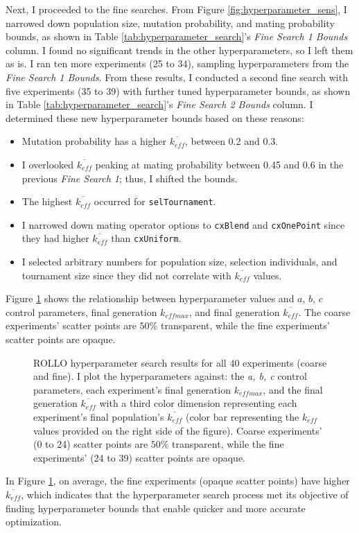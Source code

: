 Next, I proceeded to the fine searches. 
From Figure \ref{fig:hyperparameter_sens}, I narrowed down population size, 
mutation probability, and mating probability bounds, as shown in Table 
\ref{tab:hyperparameter_search}'s \textit{Fine Search 1 Bounds} column. 
I found no significant trends in the other hyperparameters, so I left them 
as is. 
I ran ten more experiments (25 to 34), sampling hyperparameters from 
the \textit{Fine Search 1 Bounds}. 
From these results, I conducted a second fine search with five experiments 
(35 to 39) with further tuned hyperparameter bounds, as shown in Table 
\ref{tab:hyperparameter_search}'s \textit{Fine Search 2 Bounds} column. 
I determined these new hyperparameter bounds based on these reasons: 
\begin{itemize}
    \item Mutation probability has a higher $\overline{k_{eff}}$, between 0.2 and 0.3.
    \item I overlooked $\overline{k_{eff}}$  peaking at mating probability between 
    0.45 and 0.6 in the previous \textit{Fine Search 1}; thus, I shifted the bounds. 
    \item The highest $\overline{k_{eff}}$ occurred for \texttt{selTournament}. 
    \item I narrowed down mating operator options to \texttt{cxBlend} and 
    \texttt{cxOnePoint} since they had higher $\overline{k_{eff}}$ than 
    \texttt{cxUniform}. 
    \item I selected arbitrary numbers for population size, 
    selection individuals, and tournament size since they did not 
    correlate with $\overline{k_{eff}}$ values. 
\end{itemize}
Figure \ref{fig:input_hyperparameters_sens} shows the relationship between 
hyperparameter values and $a$, $b$, $c$ control parameters, final generation 
$k_{eff max}$, and final generation $\overline{k_{eff}}$. 
The coarse experiments' scatter points are $50\%$ transparent, while the fine 
experiments' scatter points are opaque. 
\begin{figure}[htbp]
    \centering
    \caption{ \acrfull{ROLLO} hyperparameter search results for all 40 experiments 
    (coarse and fine). I plot the hyperparameters against: the \textit{a, b, c} control 
    parameters, each experiment's final generation $k_{eff max}$, and the final generation 
    $\overline{k_{eff}}$ with a third color dimension representing each experiment's final 
    population's $\overline{k_{eff}}$ (color bar representing the $k_{eff}$ values 
    provided on the right side of the figure). Coarse experiments' (0 to 24) scatter points 
    are $50\%$ transparent, while the fine experiments' (24 to 39) scatter points 
    are opaque. }
    \label{fig:input_hyperparameters_sens}
\end{figure}
In Figure \ref{fig:input_hyperparameters_sens}, on average, the fine experiments 
(opaque scatter points) have higher $\overline{k_{eff}}$, which indicates that the
hyperparameter search process met its objective of finding hyperparameter 
bounds that enable quicker and more accurate optimization. 

